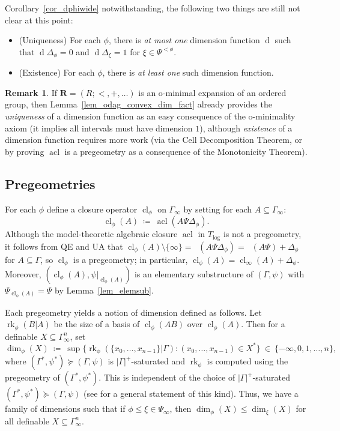 \documentclass[11pt]{amsart}
\theoremstyle{plain}
\theoremstyle{definition}
\newtheorem{remark}[thm]{Remark}
\numberwithin{equation}{section}
\newcommand\Q{\mathbb{Q}}
\DeclareMathOperator\lspan{span}
\DeclareMathOperator\Qspan{\lspan_{\Q}}
\newcommand\0{\varnothing}
\DeclareMathOperator\acl{acl}
\DeclareMathOperator\cl{cl}
\DeclareMathOperator\rk{rk}
\begin{document}
\noindent
Corollary~\ref{cor_dphiwide} notwithstanding, the following two things are still not clear at this point:
\begin{itemize}
\item (Uniqueness) For each $\phi$, there is \emph{at most one} dimension function $\operatorname{d}$ such that $\operatorname{d}\Delta_{\phi}=0$ and $\operatorname{d}\Delta_{\xi}=1$ for $\xi\in\Psi^{<\phi}$.
\item (Existence) For each $\phi$, there is \emph{at least one} such dimension function.
\end{itemize}

\begin{remark}
If $\bm{R}=(R;<,+,\ldots)$ is an o-minimal expansion of an ordered group, then Lemma~\ref{lem_odag_convex_dim_fact} already provides the \emph{uniqueness} of a dimension function as an easy consequence of the o-minimality axiom (it implies all intervals must have dimension $1$), although \emph{existence} of a dimension function requires more work (via the Cell Decomposition Theorem, or by proving $\operatorname{acl}$ is a pregeometry as a consequence of the Monotonicity Theorem).
\end{remark}

\subsection{Pregeometries}\label{subsec_pregeo}
For each $\phi$ define a closure operator $\cl_{\phi}$ on $\Gamma_{\infty}$ by setting for each $A\subseteq \Gamma_{\infty}$:
\[
\cl_{\phi}(A)\ \coloneqq\ \acl(A\Psi\Delta_{\phi}).
\]
Although the model-theoretic algebraic closure $\acl$ in $T_{\log}$ is not a pregeometry, it follows from QE and UA that $\cl_{\phi}(A) \setminus\{\infty\}=\Qspan(A\Psi\Delta_{\phi})=\Qspan(A\Psi)+\Delta_{\phi}$ for $A\subseteq\Gamma$, so $\cl_{\phi}$ is a pregeometry; in particular, $\cl_{\phi}(A)=\cl_{\infty}(A)+\Delta_{\phi}$.
Moreover, $(\cl_{\phi}(A),\psi|_{\cl_{\phi}(A)})$ is an elementary substructure of $(\Gamma,\psi)$ with $\Psi_{\cl_{\phi}(A)}=\Psi$ by Lemma~\ref{lem_elemsub}.


\medskip\noindent
Each pregeometry yields a notion of dimension defined as follows.
Let $\rk_{\phi}(B|A)$ be the size of a basis of $\cl_{\phi}(AB)$ over $\cl_{\phi}(A)$. Then for a definable $X\subseteq\Gamma_{\infty}^n$, set 
\[
\dim_{\phi}(X)\ \coloneqq\ \sup\{\rk_{\phi}(\{x_0,\dots,x_{n-1}\}|\Gamma) : (x_0,\dots,x_{n-1}) \in X^* \}  \ \in \ \{-\infty,0,1,\ldots,n\},
\]
where $(\Gamma^*,\psi^*) \succcurlyeq (\Gamma,\psi)$ is $|\Gamma|^+$-saturated and $\rk_{\phi}$ is computed using the pregeometry of $(\Gamma^*,\psi^*)$.
This is independent of the choice of $|\Gamma|^+$-saturated $(\Gamma^*,\psi^*) \succcurlyeq (\Gamma,\psi)$ (see \cite[Section~2]{angel2016bounded} for a general statement of this kind).
Thus, we have a family of dimensions such that if $\phi\leq\xi\in \Psi_{\infty}$, then $\dim_{\phi}(X)\leq\dim_{\xi}(X)$ for all definable $X \subseteq\Gamma_{\infty}^n$.
\end{document}
